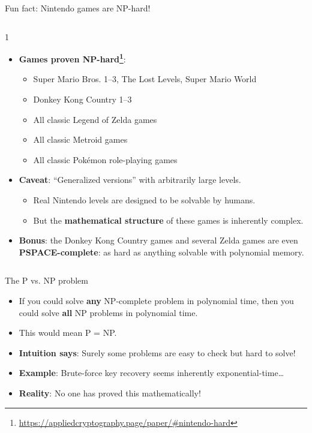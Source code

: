 \ifdefined\PRESENTATION\else\PassOptionsToClass{handout}{beamer}\fi\documentclass[aspectratio=169, lualatex]{beamer}
\begin{document}
\begin{frame}{Fun fact: Nintendo games are NP-hard!}
	\begin{columns}[c]
		\begin{column}{1\textwidth}
			\begin{itemize}[<+->]
				\item \textbf{Games proven NP-hard\footnote{\url{https://appliedcryptography.page/paper/\#nintendo-hard}}}:
				      \begin{itemize}
					      \item Super Mario Bros. 1--3, The Lost Levels, Super Mario World
					      \item Donkey Kong Country 1--3
					      \item All classic Legend of Zelda games
					      \item All classic Metroid games
					      \item All classic Pok\'emon role-playing games
				      \end{itemize}
				\item \textbf{Caveat}: ``Generalized versions'' with arbitrarily large levels.
				      \begin{itemize}
					      \item Real Nintendo levels are designed to be solvable by humans.
					      \item But the \textbf{mathematical structure} of these games is inherently complex.
				      \end{itemize}
				\item \textbf{Bonus}: the Donkey Kong Country games and several Zelda games are even \textbf{PSPACE-complete}: as hard as anything solvable with polynomial memory.
			\end{itemize}
		\end{column}
	\end{columns}
\end{frame}

\begin{frame}{The P vs. NP problem}
	\begin{itemize}[<+->]
		\item If you could solve \textbf{any} NP-complete problem in polynomial time, then you could solve \textbf{all} NP problems in polynomial time.
		\item This would mean P = NP.
		\item \textbf{Intuition says}: Surely some problems are easy to check but hard to solve!
		\item \textbf{Example}: Brute-force key recovery seems inherently exponential-time\ldots
		\item \textbf{Reality}: No one has proved this mathematically!
	\end{itemize}
\end{frame}
\end{document}
